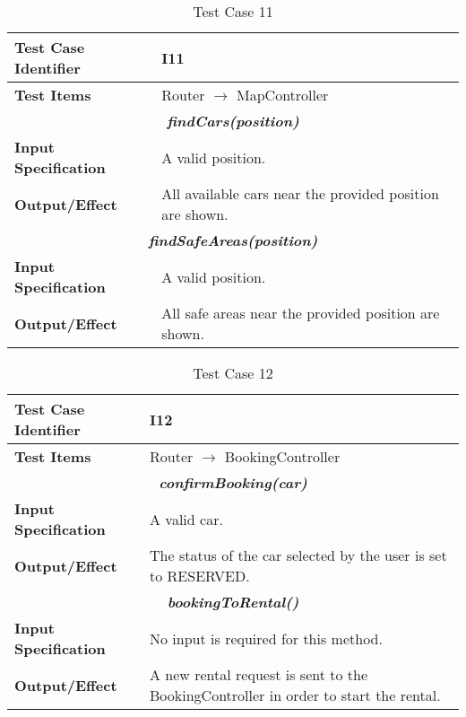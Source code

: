 \begin{table}[H]
	\begin{tabularx}{\textwidth}{l X}
		\hline
		\textbf{Test Case Identifier}	&	I11\\	\hline
		\textbf{Test Items}			&	Router $\rightarrow$ MapController \\	\hline\hline
		\multicolumn{2}{c}{\textbf{\textit{findCars(position)}}}	\\	\hline
			\textbf{Input Specification}	&	A valid position.\\	\hline
			\textbf{Output/Effect}	&	All available cars near the provided position are shown.\\	\hline\hline
		\multicolumn{2}{c}{\textbf{\textit{findSafeAreas(position)}}}	\\	\hline
			\textbf{Input Specification}	&	A valid position.\\	\hline
			\textbf{Output/Effect}	&	All safe areas near the provided position are shown.\\	\hline
	\end{tabularx}
	\captionsetup{textformat=empty,labelformat=blank}
	\caption{Test Case 11}
	\label{table:template-table-11}
\end{table}

\begin{table}[H]
	\begin{tabularx}{\textwidth}{l X}
		\hline
		\textbf{Test Case Identifier}	&	I12\\	\hline
		\textbf{Test Items}			&	Router $\rightarrow$ BookingController \\	\hline\hline
		\multicolumn{2}{c}{\textbf{\textit{confirmBooking(car)}}}	\\	\hline
			\textbf{Input Specification}	&	A valid car.\\	\hline
			\textbf{Output/Effect}	&	The status of the car selected by the user is set to RESERVED.\\	\hline\hline
		\multicolumn{2}{c}{\textbf{\textit{bookingToRental()}}}	\\	\hline
			\textbf{Input Specification}	&	No input is required for this method.\\	\hline
			\textbf{Output/Effect}	&	A new rental request is sent to the BookingController in order to start the rental.\\	\hline
	\end{tabularx}
	\captionsetup{textformat=empty,labelformat=blank}
	\caption{Test Case 12}
	\label{table:template-table-12}
\end{table}


